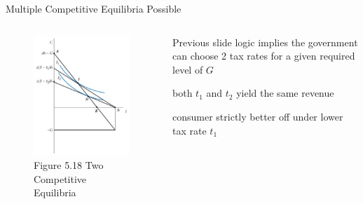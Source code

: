 \documentclass[11pt,aspectratio=169,usenames,dvipsnames]{beamer}
\let\tempone\itemize
\let\temptwo\enditemize
\renewenvironment{itemize}{\tempone\addtolength{\itemsep}{\fill}}{\temptwo}
\begin{document}
\begin{frame}{Multiple Competitive Equilibria Possible}
\label{slide:Multiple_Competitive_Equilibria_Possible}
    \begin{columns}
        \begin{column}{0.5\textwidth}
            \begin{figure}
                \caption{Figure 5.18  Two Competitive Equilibria}
                \includegraphics[width=.7\textwidth]{./figures/Figure_5_18.jpg}
            \end{figure}
        \end{column}
        \begin{column}{0.5\textwidth}
            Previous slide logic implies the government can choose 2 tax rates for a given required level of $ G $
            \begin{itemize}
                \item both $ t_{1} $ and $ t_{2} $ yield the same revenue
                \item consumer strictly better off under lower tax rate $ t_{1} $
            \end{itemize}
        \end{column}
    \end{columns}
\end{frame}
\end{document}
